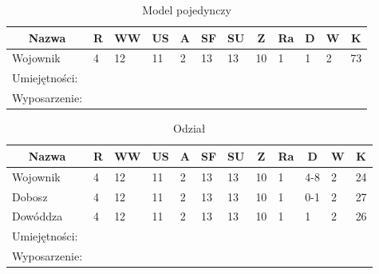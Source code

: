 
\begin{table}[h]
\caption{Model pojedynczy}

\begin{tabular}{|l|l|l|l|l|l|l|l|l|l|l|l|}
\hline
\multicolumn{1}{c}{Nazwa} & \multicolumn{1}{c}{R} & \multicolumn{1}{c}{WW} & \multicolumn{1}{c}{US} & \multicolumn{1}{c}{A} & \multicolumn{1}{c}{SF} & \multicolumn{1}{c}{SU} & \multicolumn{1}{c}{Z} & \multicolumn{1}{c}{Ra} & \multicolumn{1}{c}{D} & \multicolumn{1}{c}{W} & \multicolumn{1}{c}{K} \\ \hline
Wojownik & 4 & 12 & 11 & 2 & 13 & 13 & 10 & 1 & 1 & 2 & 73 \\ \hline
Umiejętności: \\ \hline
Wyposarzenie: \\ \hline
\end{tabular}

\end{table}

\begin{table}[h]
\caption{Odział}

\begin{tabular}{|l|l|l|l|l|l|l|l|l|l|l|l|}
\hline
\multicolumn{1}{c}{Nazwa} & \multicolumn{1}{c}{R} & \multicolumn{1}{c}{WW} & \multicolumn{1}{c}{US} & \multicolumn{1}{c}{A} & \multicolumn{1}{c}{SF} & \multicolumn{1}{c}{SU} & \multicolumn{1}{c}{Z} & \multicolumn{1}{c}{Ra} & \multicolumn{1}{c}{D} & \multicolumn{1}{c}{W} & \multicolumn{1}{c}{K} \\ \hline
Wojownik & 4 & 12 & 11 & 2 & 13 & 13 & 10 & 1 & 4-8 & 2 & 24  \\ \hline
Dobosz & 4 & 12 & 11 & 2 & 13 & 13 & 10 & 1 & 0-1 & 2 & 27 \\ \hline
Dowóddza & 4 & 12 & 11 & 2 & 13 & 13 & 10 & 1 & 1 & 2 & 26 \\ \hline
Umiejętności: \\ \hline
Wyposarzenie: \\ \hline
\end{tabular}

\end{table}
